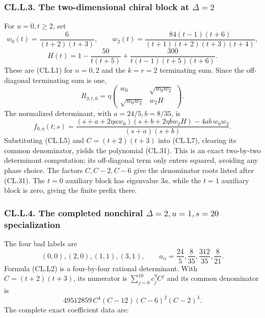 \hypertarget{cl.l.3.-the-two-dimensional-chiral-block-at-delta2}{%
\subsubsection{\texorpdfstring{CL.L.3. The two-dimensional chiral block at \(\Delta=2\)}{CL.L.3. The two-dimensional chiral block at \textbackslash Delta=2}}\label{cl.l.3.-the-two-dimensional-chiral-block-at-delta2}}

For \(u=0,t\geq2\), set \[
w_0(t)=\frac6{(t+2)(t+3)},\qquad
w_2(t)=\frac{84(t-1)(t+6)}
{(t+1)(t+2)(t+3)(t+4)},
\] \[
H(t)=1-\frac{50}{t(t+5)}
+\frac{300}{t(t-1)(t+5)(t+6)}.
\tag{CL.L5}
\] These are (CL.L1) for \(n=0,2\) and the \(k=r=2\) terminating sum. Since the off-diagonal terminating sum is one, \[
R_{3;t,0}=\eta
\begin{pmatrix}
w_0&\sqrt{w_0w_2}\\
\sqrt{w_0w_2}&w_2H
\end{pmatrix}.
\tag{CL.L6}
\] The normalized determinant, with \(a=24/5,b=8/35\), is \[
f_{0,\eta}(t;s)=
\frac{(s+a+2\eta aw_0)(s+b+2\eta bw_2H)
-4ab\,w_0w_2}{(s+a)(s+b)}.
\tag{CL.L7}
\] Substituting (CL.L5) and \(C=(t+2)(t+3)\) into (CL.L7), clearing its common denominator, yields the polynomial (CL.31). This is an exact two-by-two determinant computation; its off-diagonal term only enters squared, avoiding any phase choice. The factors \(C,C-2,C-6\) give the denominator roots listed after (CL.31). The \(t=0\) auxiliary block has eigenvalue \(3a\), while the \(t=1\) auxiliary block is zero, giving the finite prefix there.

\hypertarget{cl.l.4.-the-completed-nonchiral-delta2u1s20-specialization}{%
\subsubsection{\texorpdfstring{CL.L.4. The completed nonchiral \(\Delta=2,u=1,s=20\) specialization}{CL.L.4. The completed nonchiral \textbackslash Delta=2,u=1,s=20 specialization}}\label{cl.l.4.-the-completed-nonchiral-delta2u1s20-specialization}}

The four bad labels are \[
(0,0),(2,0),(1,1),(3,1),\qquad
a_\alpha=\frac{24}{5},\frac8{35},\frac{312}{35},\frac8{21}.
\] Formula (CL.L2) is a four-by-four rational determinant. With \(C=(t+2)(t+3)\), its numerator is \(\sum_{j=0}^{10}c_j^\eta C^j\) and its common denominator is \[
49512859\,C^4(C-12)(C-6)^2(C-2)^3.
\tag{CL.L8}
\] The complete exact coefficient data are:

